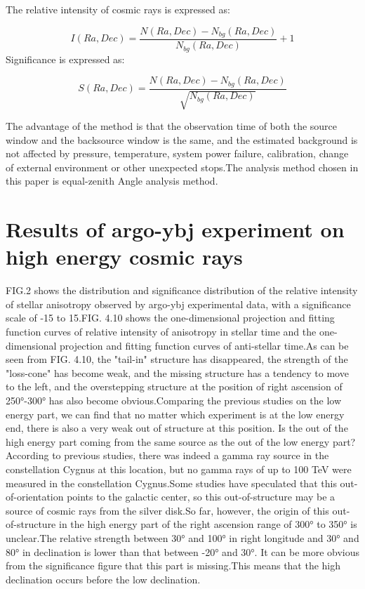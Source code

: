 \documentclass{aastex62}
\begin{document}
The relative intensity of cosmic rays is expressed as:

\begin{equation}
I(Ra,Dec)=\frac{N(Ra,Dec)-N_{bg}(Ra,Dec)}{N_{bg}(Ra,Dec)} + 1
\end{equation}
Significance is expressed as:

\begin{equation}
S(Ra,Dec)=\frac{N(Ra,Dec)-N_{bg}(Ra,Dec)}{\sqrt{N_{bg}(Ra,Dec)}}
\end{equation}

The advantage of the method is that the observation time of both the source window and the backsource window is the same, and the estimated background is not affected by pressure, temperature, system power failure, calibration, change of external environment or other unexpected stops.The analysis method chosen in this paper is equal-zenith Angle analysis method.

\section{Results of argo-ybj experiment on high energy cosmic rays}
FIG.2 shows the distribution and significance distribution of the relative intensity of stellar anisotropy observed by argo-ybj experimental data, with a significance scale of -15 to 15.FIG. 4.10 shows the one-dimensional projection and fitting function curves of relative intensity of anisotropy in stellar time and the one-dimensional projection and fitting function curves of anti-stellar time.As can be seen from FIG. 4.10, the "tail-in" structure has disappeared, the strength of the "loss-cone" has become weak, and the missing structure has a tendency to move to the left, and the overstepping structure at the position of right ascension of 250°-300° has also become obvious.Comparing the previous studies on the low energy part, we can find that no matter which experiment is at the low energy end, there is also a very weak out of structure at this position. Is the out of the high energy part coming from the same source as the out of the low energy part?According to previous studies, there was indeed a gamma ray source in the constellation Cygnus at this location, but no gamma rays of up to 100 TeV were measured in the constellation Cygnus.Some studies have speculated that this out-of-orientation points to the galactic center, so this out-of-structure may be a source of cosmic rays from the silver disk.So far, however, the origin of this out-of-structure in the high energy part of the right ascension range of 300° to 350° is unclear.The relative strength between 30° and 100° in right longitude and 30° and 80° in declination is lower than that between -20° and 30°. It can be more obvious from the significance figure that this part is missing.This means that the high declination occurs before the low declination.
\end{document}
